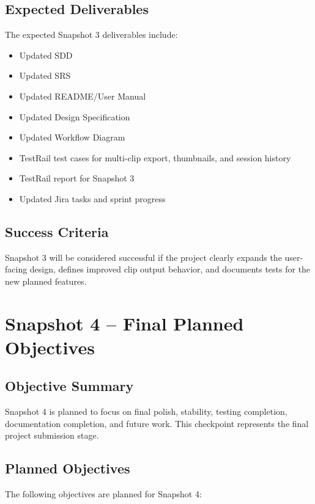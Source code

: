 \documentclass[12pt]{article}
\begin{document}
\subsection{Expected Deliverables}
The expected Snapshot 3 deliverables include:

\begin{itemize}[noitemsep]
    \item Updated SDD
    \item Updated SRS
    \item Updated README/User Manual
    \item Updated Design Specification
    \item Updated Workflow Diagram
    \item TestRail test cases for multi-clip export, thumbnails, and session history
    \item TestRail report for Snapshot 3
    \item Updated Jira tasks and sprint progress
\end{itemize}

\subsection{Success Criteria}
Snapshot 3 will be considered successful if the project clearly expands the user-facing design, defines improved clip output behavior, and documents tests for the new planned features.

\newpage

\section{Snapshot 4 -- Final Planned Objectives}

\subsection{Objective Summary}
Snapshot 4 is planned to focus on final polish, stability, testing completion, documentation completion, and future work. This checkpoint represents the final project submission stage.

\subsection{Planned Objectives}
The following objectives are planned for Snapshot 4:
\end{document}
